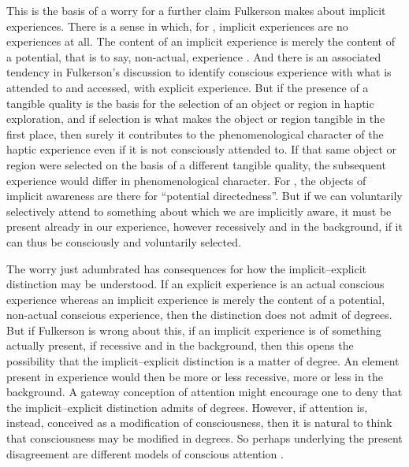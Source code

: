 This is the basis of a worry for a further claim Fulkerson makes about implicit experiences. There is a sense in which, for \citet[91]{Fulkerson:2014ek}, implicit experiences are no experiences at all. The content of an implicit experience is merely the content of a potential, that is to say, non-actual, experience \citep[95]{Fulkerson:2014ek}. And there is an associated tendency in Fulkerson's discussion to identify conscious experience with what is attended to and accessed, with explicit experience. But if the presence of a tangible quality is the basis for the selection of an object or region in haptic exploration, and if selection is what makes the object or region tangible in the first place, then surely it contributes to the phenomenological character of the haptic experience even if it is not consciously attended to. If that same object or region were selected on the basis of a different tangible quality, the subsequent experience would differ in phenomenological character. For \citet[95]{Fulkerson:2014ek}, the objects of implicit awareness are there for ``potential directedness''. But if we can voluntarily selectively attend to something about which we are implicitly aware, it must be present already in our experience, however recessively and in the background, if it can thus be consciously and voluntarily selected.

The worry just adumbrated has consequences for how the implicit--explicit distinction may be understood. If an explicit experience is an actual conscious experience whereas an implicit experience is merely the content of a potential, non-actual conscious experience, then the distinction does not admit of degrees. But if Fulkerson is wrong about this, if an implicit experience is of something actually present, if recessive and in the background, then this opens the possibility that the implicit--explicit distinction is a matter of degree. An element present in experience would then be more or less recessive, more or less in the background. A gateway conception of attention might encourage one to deny that the implicit--explicit distinction admits of degrees. However, if attention is, instead, conceived as a modification of consciousness, then it is natural to think that consciousness may be modified in degrees. So perhaps underlying the present disagreement are different models of conscious attention \citep[see][for an excellent recent discussion of attention]{Wu:2014aa}.

